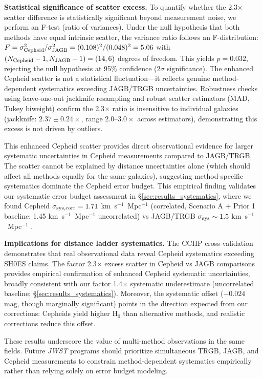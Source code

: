 \documentclass[preprint, linenumbers]{aastex701}
\begin{document}
\textbf{Statistical significance of scatter excess.} To quantify whether the 2.3$\times$ scatter difference is statistically significant beyond measurement noise, we perform an F-test (ratio of variances). Under the null hypothesis that both methods have equal intrinsic scatter, the variance ratio follows an F-distribution: $F = \sigma^2_{\rm Cepheid}/\sigma^2_{\rm JAGB} = (0.108)^2/(0.048)^2 = 5.06$ with $(N_{\rm Cepheid}-1, N_{\rm JAGB}-1) = (14, 6)$ degrees of freedom. This yields $p = 0.032$, rejecting the null hypothesis at 95\% confidence (2$\sigma$ significance). The enhanced Cepheid scatter is not a statistical fluctuation---it reflects genuine method-dependent systematics exceeding JAGB/TRGB uncertainties. Robustness checks using leave-one-out jackknife resampling and robust scatter estimators (MAD, Tukey biweight) confirm the 2.3$\times$ ratio is insensitive to individual galaxies (jackknife: $2.37 \pm 0.24\times$, range $2.0$--$3.0\times$ across estimators), demonstrating this excess is not driven by outliers.

This enhanced Cepheid scatter provides direct observational evidence for larger systematic uncertainties in Cepheid measurements compared to JAGB/TRGB. The scatter cannot be explained by distance uncertainties alone (which should affect all methods equally for the same galaxies), suggesting method-specific systematics dominate the Cepheid error budget. This empirical finding validates our systematic error budget assessment in \S\ref{sec:results_systematics}, where we found Cepheid $\sigma_{\rm sys,corr} = 1.71$ km~s$^{-1}$~Mpc$^{-1}$ (correlated, Scenario A + Prior 1 baseline; 1.45 km~s$^{-1}$~Mpc$^{-1}$ uncorrelated) vs JAGB/TRGB $\sigma_{\rm sys} \sim 1.5$ km~s$^{-1}$~Mpc$^{-1}$ \citep{Freedman2025a}.

\textbf{Implications for distance ladder systematics.} The CCHP cross-validation demonstrates that real observational data reveal Cepheid systematics exceeding SH0ES claims. The factor 2.3$\times$ excess scatter in Cepheid vs JAGB comparisons provides empirical confirmation of enhanced Cepheid systematic uncertainties, broadly consistent with our factor 1.4$\times$ systematic underestimate (uncorrelated baseline; \S\ref{sec:results_systematics}). Moreover, the systematic offset ($-0.024$ mag, though marginally significant) points in the direction expected from our corrections: Cepheids yield higher H$_0$ than alternative methods, and realistic corrections reduce this offset.

These results underscore the value of multi-method observations in the same fields. Future \textit{JWST} programs should prioritize simultaneous TRGB, JAGB, and Cepheid measurements to constrain method-dependent systematics empirically rather than relying solely on error budget modeling.
\end{document}
